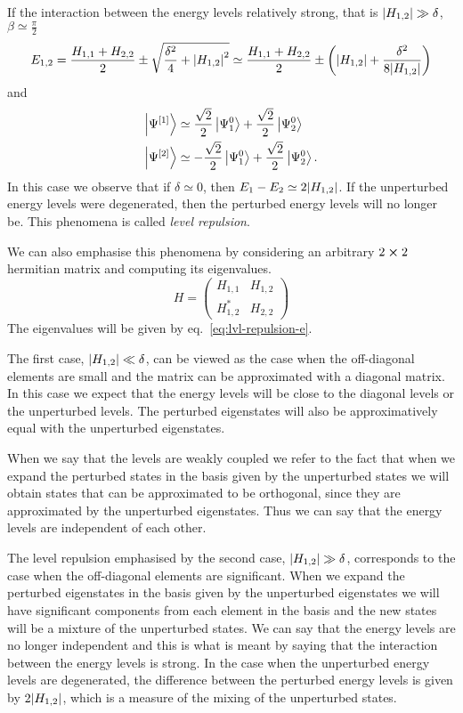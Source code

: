 \documentclass[../thesis.tex]{subfiles}
\theoremstyle{definition}
\begin{document}
If the {\color{red}interaction} between the energy levels relatively strong,
that is \(\abs{H_{1,2}} \gg \delta \), \(\beta \simeq \frac{\pi}{2}\)
\[
  E_{1,2} = \frac{H_{1,1} + H_{2,2}}{2} \pm
            \sqrt{\frac{\delta^2}{4} + \abs{H_{1,2}}^2}
          \simeq \frac{H_{1,1} + H_{2,2}}{2} \pm
          \left(\abs{H_{1,2}} + \frac{\delta^2}{8\abs{H_{1,2}}}\right)
\]
and
\begin{align*}
  \ket{\Psi^{[1]}} &\simeq \frac{\sqrt{2}}{2} \ket{\Psi_1^0} + \frac{\sqrt{2}}{2} \ket{\Psi_2^0} \\
  \ket{\Psi^{[2]}} &\simeq -\frac{\sqrt{2}}{2} \ket{\Psi_1^0} + \frac{\sqrt{2}}{2} \ket{\Psi_2^0}.
\end{align*}
In this case we observe that if \(\delta \simeq 0\),
then \(E_1 - E_2 \simeq 2\abs{H_{1,2}}\). If the unperturbed energy levels were
degenerated, then the perturbed energy levels will no longer be. This phenomena
is called \emph{level repulsion}.

We can also emphasise this phenomena by considering an arbitrary \(2 \cross 2\)
hermitian matrix and computing its eigenvalues.
\[
  H = \begin{pmatrix}
  H_{1,1}   & H_{1,2} \\
  H_{1,2}^* & H_{2,2}
  \end{pmatrix}
\]
The eigenvalues will be given by eq.~\eqref{eq:lvl-repulsion-e}.

The first case, \(\abs{H_{1,2}} \ll \delta \), can be viewed as the case when
the off-diagonal elements are small and the matrix can be approximated with
a diagonal matrix. In this case we expect that the energy levels will be close
to the diagonal levels or the unperturbed levels. The perturbed eigenstates
will also be approximatively equal with the unperturbed eigenstates.

When we say that the levels are weakly coupled we refer to the fact that when we
expand the perturbed states in the basis given by the unperturbed states we will
obtain states that can be approximated to be orthogonal, since they are approximated
by the unperturbed eigenstates. Thus we can say that the energy levels are
independent of each other.

The level repulsion emphasised by the second case, \(\abs{H_{1,2}} \gg \delta \),
corresponds to the case when the off-diagonal elements are significant. When we
expand the perturbed eigenstates in the basis given by the unperturbed eigenstates
we will have significant components from each element in the basis and the new
states will be a mixture of the unperturbed states. We can say that the energy levels
are no longer independent and this is what is meant by saying that the interaction
between the energy levels is strong. In the case when the unperturbed energy
levels are degenerated, the difference between the perturbed energy levels
is given by \(2 \abs{H_{1,2}}\), which is a measure of the mixing of the
unperturbed states.
\end{document}
